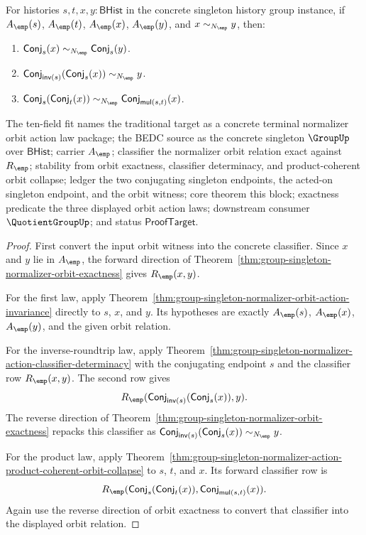 \begin{theorem}
\label{thm:group-singleton-normalizer-orbit-action-law-package}
For histories $s,t,x,y:\mathsf{BHist}$ in the concrete singleton history group
instance, if $A_{\emp}(s)$, $A_{\emp}(t)$, $A_{\emp}(x)$, $A_{\emp}(y)$, and
$x\sim_{N_{\emp}}y$, then:
\begin{enumerate}
\item $\mathsf{Conj}_s(x)\sim_{N_{\emp}}\mathsf{Conj}_s(y)$.
\item
$\mathsf{Conj}_{\mathsf{inv}(s)}(\mathsf{Conj}_s(x))\sim_{N_{\emp}}y$.
\item
$\mathsf{Conj}_s(\mathsf{Conj}_t(x))\sim_{N_{\emp}}
\mathsf{Conj}_{\mathsf{mul}(s,t)}(x)$.
\end{enumerate}
The ten-field fit names the traditional target as a concrete terminal
normalizer orbit action law package; the BEDC source as the concrete singleton
$\GroupUp$ over $\mathsf{BHist}$; carrier $A_{\emp}$; classifier the
normalizer orbit relation exact against $R_{\emp}$; stability from orbit
exactness, classifier determinacy, and product-coherent orbit collapse; ledger
the two conjugating singleton endpoints, the acted-on singleton endpoint, and
the orbit witness; core theorem this block; exactness predicate the three
displayed orbit action laws; downstream consumer $\QuotientGroupUp$; and status
$\mathsf{ProofTarget}$.
\end{theorem}
\begin{proof}
First convert the input orbit witness into the concrete classifier. Since $x$
and $y$ lie in $A_{\emp}$, the forward direction of
Theorem~\ref{thm:group-singleton-normalizer-orbit-exactness} gives
$R_{\emp}(x,y)$.

For the first law, apply
Theorem~\ref{thm:group-singleton-normalizer-orbit-action-invariance} directly
to $s$, $x$, and $y$. Its hypotheses are exactly $A_{\emp}(s)$,
$A_{\emp}(x)$, $A_{\emp}(y)$, and the given orbit relation.

For the inverse-roundtrip law, apply
Theorem~\ref{thm:group-singleton-normalizer-action-classifier-determinacy} with
the conjugating endpoint $s$ and the classifier row $R_{\emp}(x,y)$. The second
row gives
$$
R_{\emp}(\mathsf{Conj}_{\mathsf{inv}(s)}(\mathsf{Conj}_s(x)),y).
$$
The reverse direction of
Theorem~\ref{thm:group-singleton-normalizer-orbit-exactness} repacks this
classifier as
$\mathsf{Conj}_{\mathsf{inv}(s)}(\mathsf{Conj}_s(x))\sim_{N_{\emp}}y$.

For the product law, apply
Theorem~\ref{thm:group-singleton-normalizer-action-product-coherent-orbit-collapse}
to $s$, $t$, and $x$. Its forward classifier row is
$$
R_{\emp}(\mathsf{Conj}_s(\mathsf{Conj}_t(x)),
\mathsf{Conj}_{\mathsf{mul}(s,t)}(x)).
$$
Again use the reverse direction of orbit exactness to convert that classifier
into the displayed orbit relation.
\end{proof}

